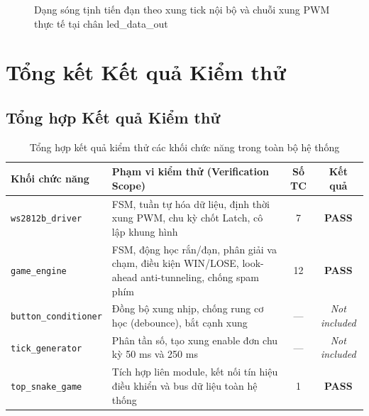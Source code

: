 \documentclass[12pt,a4paper]{article}
\begin{document}
\begin{figure}[H]
    \centering
    \caption{Dạng sóng tịnh tiến đạn theo xung tick nội bộ và chuỗi xung PWM thực tế tại chân led\_data\_out}
    \label{fig:top_pwm}
\end{figure}

\newpage
\section{Tổng kết Kết quả Kiểm thử}

\subsection{Tổng hợp Kết quả Kiểm thử}

\begin{table}[H]
\centering
\caption{Tổng hợp kết quả kiểm thử các khối chức năng trong toàn bộ hệ thống}
\label{tab:system_test_summary}
\vspace{2mm}
\renewcommand{\arraystretch}{1.25}
\begin{tabularx}{\textwidth}{|l|X|c|c|}
\hline
\textbf{Khối chức năng} & \textbf{Phạm vi kiểm thử (Verification Scope)} & \textbf{Số TC} & \textbf{Kết quả} \\ \hline
\texttt{ws2812b\_driver} & FSM, tuần tự hóa dữ liệu, định thời xung PWM, chu kỳ chốt Latch, cô lập khung hình & 7 & \textbf{PASS} \\ \hline
\texttt{game\_engine} & FSM, động học rắn/đạn, phân giải va chạm, điều kiện WIN/LOSE, look-ahead anti-tunneling, chống spam phím & 12 & \textbf{PASS} \\ \hline
\texttt{button\_conditioner} & Đồng bộ xung nhịp, chống rung cơ học (debounce), bắt cạnh xung & --- & \textit{Not included} \\ \hline
\texttt{tick\_generator} & Phân tần số, tạo xung enable đơn chu kỳ 50 ms và 250 ms & --- & \textit{Not included} \\ \hline
\texttt{top\_snake\_game} & Tích hợp liên module, kết nối tín hiệu điều khiển và bus dữ liệu toàn hệ thống & 1 & \textbf{PASS} \\ \hline
\end{tabularx}
\end{table}
\end{document}
